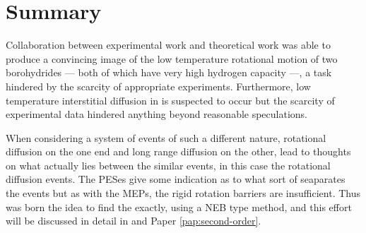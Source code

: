 \section{Summary}
\label{sec:borohydrides-summary}

Collaboration between experimental work and theoretical work was able to produce a convincing image of the low temperature rotational motion of two borohydrides --- both of which have very high hydrogen capacity ---, a task hindered by the scarcity of appropriate experiments.
Furthermore, low temperature  interstitial diffusion in  is suspected to occur but the scarcity of experimental data hindered anything beyond reasonable speculations.

When considering a system of events of such a different nature, rotational diffusion on the one end and long range diffusion on the other, lead to thoughts on what actually lies between the similar events, in this case the rotational diffusion events.
The PESes give some indication as to what sort of  seaparates the events but as with the MEPs, the rigid rotation barriers are insufficient.
Thus was born the idea to find the  exactly, using a NEB type method, and this effort will be discussed in detail in  and Paper \ref{pap:second-order}.
